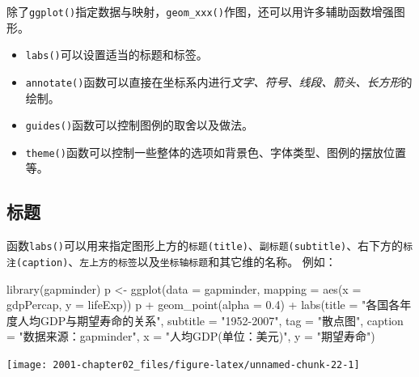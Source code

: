 \documentclass[
]{book}
\newenvironment{Shaded}{\begin{snugshade}}{\end{snugshade}}
\newcommand{\AttributeTok}[1]{\textcolor[rgb]{0.77,0.63,0.00}{#1}}
\newcommand{\FloatTok}[1]{\textcolor[rgb]{0.00,0.00,0.81}{#1}}
\newcommand{\FunctionTok}[1]{\textcolor[rgb]{0.00,0.00,0.00}{#1}}
\newcommand{\NormalTok}[1]{#1}
\newcommand{\OtherTok}[1]{\textcolor[rgb]{0.56,0.35,0.01}{#1}}
\newcommand{\SpecialCharTok}[1]{\textcolor[rgb]{0.00,0.00,0.00}{#1}}
\newcommand{\StringTok}[1]{\textcolor[rgb]{0.31,0.60,0.02}{#1}}
\providecommand{\tightlist}{%
  \setlength{\itemsep}{0pt}\setlength{\parskip}{0pt}}
\begin{document}
除了\texttt{ggplot()}指定数据与映射，\texttt{geom\_xxx()}作图，还可以用许多辅助函数增强图形。

\begin{itemize}
\tightlist
\item
  \texttt{labs()}可以设置适当的标题和标签。
\item
  \texttt{annotate()}函数可以直接在坐标系内进行\emph{文字、符号、线段、箭头、长方形}的绘制。
\item
  \texttt{guides()}函数可以控制图例的取舍以及做法。
\item
  \texttt{theme()}函数可以控制一些整体的选项如背景色、字体类型、图例的摆放位置等。
\end{itemize}

\hypertarget{ux6807ux9898}{%
\subsection{标题}\label{ux6807ux9898}}

函数\texttt{labs()}可以用来指定图形上方的\texttt{标题(title)}、\texttt{副标题(subtitle)}、右下方的\texttt{标注(caption)}、\texttt{左上方的标签}以及\texttt{坐标轴标题}和其它维的名称。
例如：

\begin{Shaded}
\begin{Highlighting}[]
\FunctionTok{library}\NormalTok{(gapminder)}
\NormalTok{p }\OtherTok{\textless{}{-}} \FunctionTok{ggplot}\NormalTok{(}\AttributeTok{data =}\NormalTok{ gapminder, }\AttributeTok{mapping =} \FunctionTok{aes}\NormalTok{(}\AttributeTok{x =}\NormalTok{ gdpPercap, }\AttributeTok{y =}\NormalTok{ lifeExp))}
\NormalTok{p }\SpecialCharTok{+} \FunctionTok{geom\_point}\NormalTok{(}\AttributeTok{alpha =} \FloatTok{0.4}\NormalTok{) }\SpecialCharTok{+} \FunctionTok{labs}\NormalTok{(}\AttributeTok{title =} \StringTok{"各国各年度人均GDP与期望寿命的关系"}\NormalTok{, }
    \AttributeTok{subtitle =} \StringTok{"1952{-}2007"}\NormalTok{, }\AttributeTok{tag =} \StringTok{"散点图"}\NormalTok{, }\AttributeTok{caption =} \StringTok{"数据来源：gapminder"}\NormalTok{, }
    \AttributeTok{x =} \StringTok{"人均GDP(单位：美元)"}\NormalTok{, }\AttributeTok{y =} \StringTok{"期望寿命"}\NormalTok{)}
\end{Highlighting}
\end{Shaded}

\begin{center}\texttt{[image: 2001-chapter02\_files/figure-latex/unnamed-chunk-22-1]} \end{center}
\end{document}
